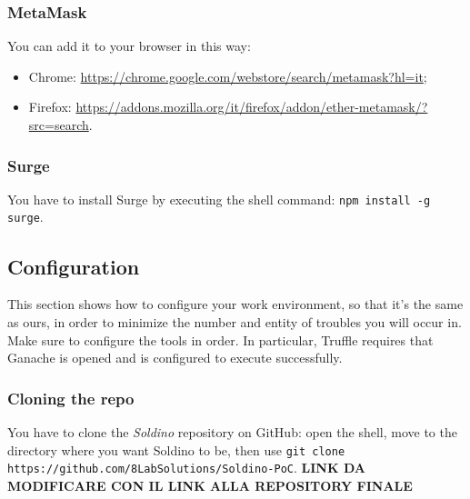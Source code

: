 \subsubsection{MetaMask}
You can add it to your browser in this way:
\begin{itemize}
	\item Chrome:  \href{https://chrome.google.com/webstore/search/metamask?hl=it}{https://chrome.google.com/webstore/search/metamask?hl=it};
	\item Firefox: \href{https://addons.mozilla.org/it/firefox/addon/ether-metamask/?src=search}{https://addons.mozilla.org/it/firefox/addon/ether-metamask/?src=search}.
\end{itemize}


\subsubsection{Surge}
You have to install Surge by executing the shell command: \texttt{npm install -g surge}.


\subsection{Configuration}
This section shows how to configure your work environment, so that it's the same as ours, in order to minimize the number and entity of troubles you will occur in.\\
Make sure to configure the tools in order. In particular, Truffle requires that Ganache is opened and is configured to execute successfully.
\subsubsection{Cloning the repo}
You have to clone the \textit{Soldino} repository on GitHub: open the shell, move to the directory where you want Soldino to be, then use \texttt{git clone https://github.com/8LabSolutions/Soldino-PoC}. \textbf{LINK DA MODIFICARE CON IL LINK ALLA REPOSITORY FINALE}

